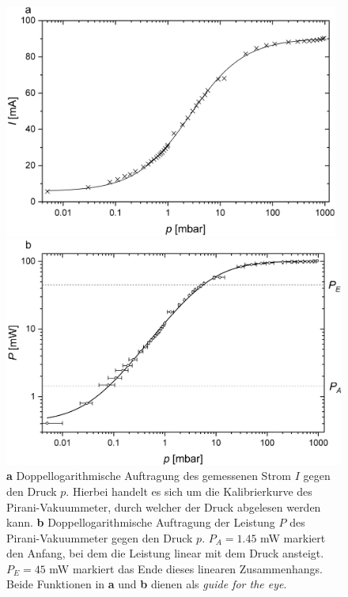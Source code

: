 \documentclass[a4paper,usenatbib]{aspdoc}
\begin{document}
            \begin{figure}
                \centering
                
                \includegraphics[width=110mm]{graphs/kalibStrom1.png}
                
                \hspace{.15cm}
                \includegraphics[width=115mm]{graphs/kalibLeistung1_fit.png}
                
                \caption{
                    \textbf{a} Doppellogarithmische Auftragung des gemessenen Strom $I$ gegen den Druck $p$. Hierbei handelt es sich um die Kalibrierkurve des Pirani-Vakuummeter, durch welcher der Druck abgelesen werden kann.
                    \textbf{b} Doppellogarithmische Auftragung der Leistung $P$ des Pirani-Vakuummeter gegen den Druck $p$. $P_A = 1.45$ mW markiert den Anfang, bei dem die Leistung linear mit dem Druck ansteigt. $P_E = 45$ mW markiert das Ende dieses linearen Zusammenhangs. \\
                    Beide Funktionen in \textbf{a} und \textbf{b} dienen als \textit{guide for the eye}.
                }
                \label{fig:calibration}
            \end{figure}
            
\end{document}
